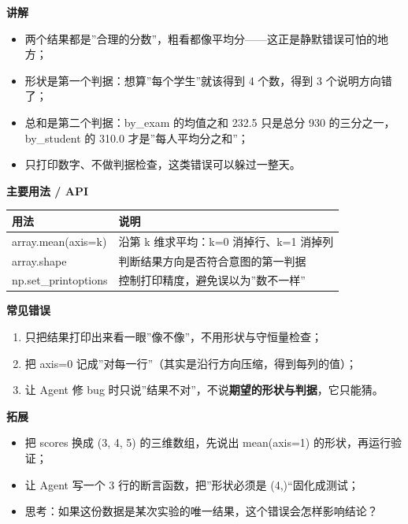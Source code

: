\textbf{讲解}

\begin{itemize}
\tightlist
\item
  两个结果都是''合理的分数''，粗看都像平均分------这正是静默错误可怕的地方；
\item
  形状是第一个判据：想算''每个学生''就该得到 4 个数，得到 3
  个说明方向错了；
\item
  总和是第二个判据：by\_exam 的均值之和 232.5 只是总分 930
  的三分之一，by\_student 的 310.0 才是''每人平均分之和''；
\item
  只打印数字、不做判据检查，这类错误可以躲过一整天。
\end{itemize}

\textbf{主要用法 / API}

{\def\LTcaptype{none} %
\begin{longtable}[]{@{}ll@{}}
\toprule\noalign{}
用法 & 说明 \\
\midrule\noalign{}
\endhead
\bottomrule\noalign{}
\endlastfoot
array.mean(axis=k) & 沿第 k 维求平均：k=0 消掉行、k=1 消掉列 \\
array.shape & 判断结果方向是否符合意图的第一判据 \\
np.set\_printoptions & 控制打印精度，避免误以为''数不一样'' \\
\end{longtable}
}

\textbf{常见错误}

\begin{enumerate}
\def\labelenumi{\arabic{enumi}.}
\tightlist
\item
  只把结果打印出来看一眼''像不像''，不用形状与守恒量检查；
\item
  把 axis=0 记成''对每一行''（其实是沿行方向压缩，得到每列的值）；
\item
  让 Agent 修 bug
  时只说''结果不对''，不说\textbf{期望的形状与判据}，它只能猜。
\end{enumerate}

\textbf{拓展}

\begin{itemize}
\tightlist
\item
  把 scores 换成 (3, 4, 5) 的三维数组，先说出 mean(axis=1)
  的形状，再运行验证；
\item
  让 Agent 写一个 3 行的断言函数，把''形状必须是 (4,)``固化成测试；
\item
  思考：如果这份数据是某次实验的唯一结果，这个错误会怎样影响结论？
\end{itemize}

